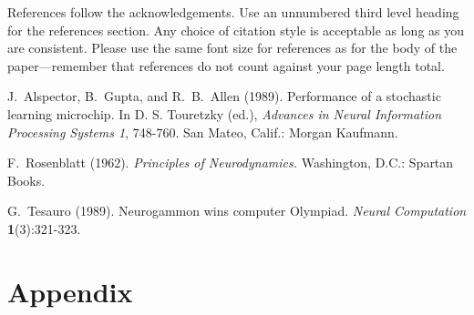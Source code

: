 \documentclass[twoside]{article} \usepackage{aistats2017}
\begin{document}
References follow the acknowledgements.  Use an unnumbered third level
heading for the references section.  Any choice of citation style is
acceptable as long as you are consistent.  Please use the same font
size for references as for the body of the paper---remember that
references do not count against your page length total.

J.~Alspector, B.~Gupta, and R.~B.~Allen (1989). Performance of a
stochastic learning microchip.  In D. S. Touretzky (ed.), {\it
  Advances in Neural Information Processing Systems 1}, 748-760.  San
Mateo, Calif.: Morgan Kaufmann.

F.~Rosenblatt (1962). {\it Principles of Neurodynamics.} Washington,
D.C.: Spartan Books.

G.~Tesauro (1989). Neurogammon wins computer Olympiad.  {\it Neural
  Computation} {\bf 1}(3):321-323.


\section{Appendix}
\end{document}
